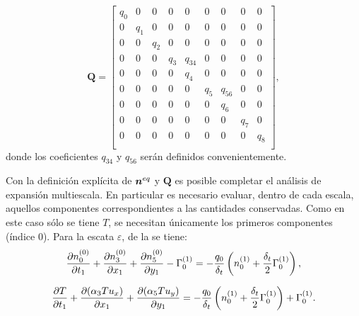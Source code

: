 \begin{equation}
	\bm{Q}=
	\begin{bmatrix}
	q_0 & 0 & 0 & 0 & 0 & 0 & 0 & 0 & 0 \\
	0 & q_1 & 0 & 0 & 0 & 0 & 0 & 0 & 0 \\
	0 & 0 & q_2 & 0 & 0 & 0 & 0 & 0 & 0 \\
	0 & 0 & 0 & q_3 & q_{34} & 0 & 0 & 0 & 0 \\
	0 & 0 & 0 & 0 & q_4 & 0 & 0 & 0 & 0 \\
	0 & 0 & 0 & 0 & 0 & q_5 & q_{56} & 0 & 0 \\
	0 & 0 & 0 & 0 & 0 & 0 & q_6 & 0 & 0 \\
	0 & 0 & 0 & 0 & 0 & 0 & 0 & q_7 & 0 \\
	0 & 0 & 0 & 0 & 0 & 0 & 0 & 0 & q_8 \\
	\end{bmatrix},
\end{equation} 
donde los coeficientes $q_{34}$ y $q_{56}$ ser\'an definidos convenientemente.  

Con la definici\'on expl\'icita de $\bm{n}^{eq}$ y $\bm{Q}$ es posible completar el an\'alisis de expansi\'on multiescala. En particular es necesario evaluar, dentro de cada escala, aquellos componentes correspondientes a las cantidades conservadas. Como en este caso s\'olo se tiene $T$, se necesitan \'unicamente los primeros componentes (\'indice 0). Para la escata $\varepsilon$, de la  se tiene:
\begin{equation}
	\dfrac{ \partial n_{0}^{(0)}}{\partial t_1}  +  \dfrac{ \partial n_{3}^{(0)}}{\partial x_1} + \dfrac{ \partial n_{5}^{(0)}}{\partial y_1} - \Gamma_0^{(1)}= -\dfrac{q_0}{\delta_t} \left( n_{0}^{(1)} + \dfrac{\delta_t}{2} \Gamma_0^{(1)} \right),
\end{equation}

\begin{equation}
	\dfrac{ \partial T}{\partial t_1}  +  \dfrac{ \partial (\alpha_3 T u_x)}{\partial x_1} + \dfrac{ \partial (\alpha_5 T u_y)}{\partial y_1} = -\dfrac{q_0}{\delta_t} \left( n_{0}^{(1)} + \dfrac{\delta_t}{2} \Gamma_0^{(1)} \right) + \Gamma_0^{(1)}.
	\label{eq:T_eps_1}
\end{equation}

